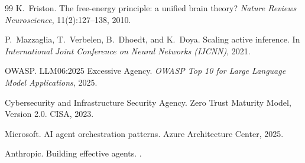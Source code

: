 \documentclass[11pt]{article}
\begin{document}
\begin{thebibliography}{99}
K.~Friston.
\newblock The free-energy principle: a unified brain theory?
\newblock \emph{Nature Reviews Neuroscience}, 11(2):127--138, 2010.

P.~Mazzaglia, T.~Verbelen, B.~Dhoedt, and K.~Doya.
\newblock Scaling active inference.
\newblock In \emph{International Joint Conference on Neural Networks (IJCNN)}, 2021.

OWASP.
\newblock LLM06:2025 Excessive Agency.
\newblock \emph{OWASP Top 10 for Large Language Model Applications}, 2025.

Cybersecurity and Infrastructure Security Agency.
\newblock Zero Trust Maturity Model, Version 2.0.
\newblock CISA, 2023.

Microsoft.
\newblock AI agent orchestration patterns.
\newblock Azure Architecture Center, 2025.

Anthropic.
\newblock Building effective agents.
.

\end{thebibliography}
\end{document}
